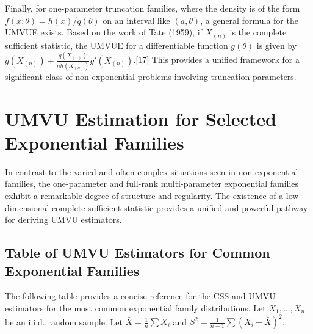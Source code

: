 \documentclass[11pt, letterpaper]{article}
\begin{document}
Finally, for one-parameter truncation families, where the density is of the form $f(x;\theta) = h(x)/q(\theta)$ on an interval like $(a, \theta)$, a general formula for the UMVUE exists. Based on the work of Tate (1959), if $X_{(n)}$ is the complete sufficient statistic, the UMVUE for a differentiable function $g(\theta)$ is given by $g(X_{(n)}) + \frac{q(X_{(n)})}{n h(X_{(n)})} g'(X_{(n)})$.[17] This provides a unified framework for a significant class of non-exponential problems involving truncation parameters.

\section*{UMVU Estimation for Selected Exponential Families}
In contrast to the varied and often complex situations seen in non-exponential families, the one-parameter and full-rank multi-parameter exponential families exhibit a remarkable degree of structure and regularity. The existence of a low-dimensional complete sufficient statistic provides a unified and powerful pathway for deriving UMVU estimators.

\subsection*{Table of UMVU Estimators for Common Exponential Families}
The following table provides a concise reference for the CSS and UMVU estimators for the most common exponential family distributions. Let $X_1, \dots, X_n$ be an i.i.d. random sample. Let $\bar{X} = \frac{1}{n} \sum X_i$ and $S^2 = \frac{1}{n-1} \sum (X_i - \bar{X})^2$.
\end{document}
